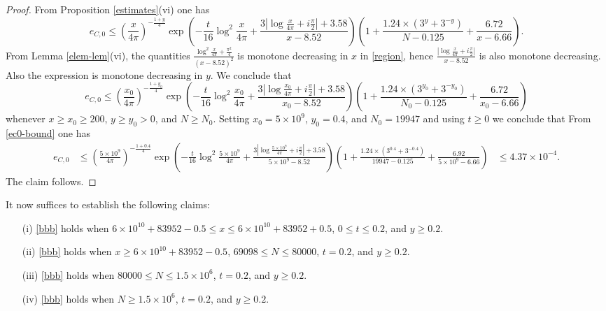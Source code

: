 \begin{proof}
From Proposition \ref{estimates}(vi) one has
$$ e_{C,0} \leq \left(\frac{x}{4\pi}\right)^{-\frac{1+y}{4}} \exp\left( - \frac{t}{16} \log^2 \frac{x}{4\pi} + \frac{3 |\log \frac{x}{4\pi} + i \frac{\pi}{2}|+3.58}{x-8.52} \right) \left(1 + \frac{1.24 \times (3^y+3^{-y})}{N-0.125} + \frac{6.72}{x-6.66}\right).$$
From Lemma \ref{elem-lem}(vi), the quantities $\frac{\log^2 \frac{x}{4\pi} + \frac{\pi^2}{4}}{(x-8.52)^2}$ is monotone decreasing in $x$ in \eqref{region}, hence $\frac{|\log \frac{x}{4\pi} + i \frac{\pi}{2}|}{x-8.52}$ is also monotone decreasing.  Also the expression is monotone decreasing in $y$. We conclude that
\begin{equation}\label{ec0-bound}
 e_{C,0} \leq \left(\frac{x_0}{4\pi}\right)^{-\frac{1+y_0}{4}} \exp\left( - \frac{t}{16} \log^2 \frac{x_0}{4\pi} + \frac{3 |\log \frac{x_0}{4\pi} + i \frac{\pi}{2}|+3.58}{x_0-8.52} \right) \left(1 + \frac{1.24 \times (3^{y_0}+3^{-y_0})}{N_0-0.125} + \frac{6.72}{x_0-6.66}\right)
\end{equation}
whenever $x \geq x_0 \geq 200$, $y \geq y_0 > 0$, and $N \geq N_0$.  Setting $x_0 = 5 \times 10^9$, $y_0 = 0.4$, and $N_0 = 19947$ and using $t \geq 0$ we conclude that
From \eqref{ec0-bound} one has
\begin{align*}
e_{C,0} &\leq \left(\frac{5 \times 10^9}{4\pi}\right)^{-\frac{1+0.4}{4}} \exp\left( - \frac{t}{16} \log^2 \frac{5 \times 10^9}{4\pi} + \frac{3 |\log \frac{5 \times 10^9}{4\pi} + i \frac{\pi}{2}|+3.58}{5 \times 10^9-8.52} \right) \left(1 + \frac{1.24 \times (3^{0.4}+3^{-0.4})}{19947-0.125} + \frac{6.92}{5 \times 10^9-6.66}\right)
&\leq 4.37 \times 10^{-4}.
\end{align*}
The claim follows.
\end{proof}


It now suffices to establish the following claims:

\begin{itemize}
\item[(i)]  \eqref{bbb} holds when $6 \times 10^{10} + 83952 - 0.5 \leq x \leq 6 \times 10^{10} + 83952 + 0.5$, $0 \leq t \leq 0.2$, and $y \geq 0.2$.
\item[(ii)]  \eqref{bbb} holds when $x \geq 6 \times 10^{10} + 83952 - 0.5$, $69098 \leq N \leq 80000$, $t = 0.2$, and $y \geq 0.2$.
\item[(iii)]  \eqref{bbb} holds when $80000 \leq N \leq 1.5 \times 10^6$, $t = 0.2$, and $y \geq 0.2$.
\item[(iv)]  \eqref{bbb} holds when $N \geq 1.5 \times 10^6$, $t = 0.2$, and $y \geq 0.2$.
\end{itemize}


